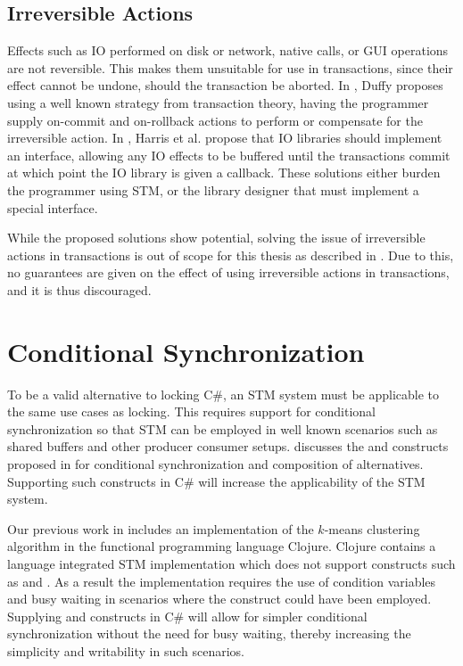 \subsection{Irreversible Actions}\label{subsec:irreversible}
Effects such as \ac{IO} performed on disk or network, native calls, or GUI operations are not reversible. This makes them unsuitable for use in transactions, since their effect cannot be undone, should the transaction be aborted. In \cite{duffy2010stmnet}, Duffy proposes using a well known strategy from transaction theory\cite{reuter1993transaction}, having the programmer supply on-commit and on-rollback actions to perform or compensate for the irreversible action. In \cite{harris2005exceptions}, Harris et al. propose that \ac{IO} libraries should implement an interface, allowing any \ac{IO} effects to be buffered until the transactions commit at which point the \ac{IO} library is given a callback. These solutions either burden the programmer using \ac{STM}, or the library designer that must implement a special interface.

While the proposed solutions show potential, solving the issue of irreversible actions in transactions is out of scope for this thesis as described in . Due to this, no guarantees are given on the effect of using irreversible actions in transactions, and it is thus discouraged.

\section{Conditional Synchronization}
\label{sec:req_conditional}
To be a valid alternative to locking C\#, an \ac{STM} system must be applicable to the same use cases as locking. This requires support for conditional synchronization so that \ac{STM} can be employed in well known scenarios such as shared buffers and other producer consumer setups\cite[p. 128]{tanenbaum2008modern}.  discusses the  and  constructs proposed in \cite{harris2005composable} for conditional synchronization and composition of alternatives. Supporting such constructs in C\# will increase the applicability of the \ac{STM} system.

Our previous work in \cite{dpt907e14trending} includes an implementation of the $k$-means clustering algorithm\cite[p. 451]{dataminingconceptsandtechniques} in the functional programming language Clojure. Clojure contains a language integrated \ac{STM} implementation which does not support constructs such as  and . As a result the implementation requires the use of condition variables and busy waiting in scenarios where the  construct could have been employed\cite{duffy2010stmnet}. Supplying  and  constructs in C\# will allow for simpler conditional synchronization without the need for busy waiting, thereby increasing the simplicity and writability in such scenarios.

